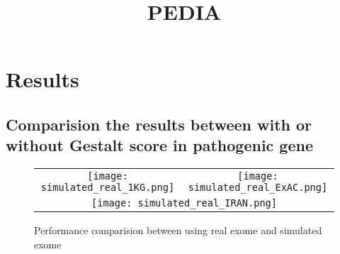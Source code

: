 \documentclass[12pt,cspaper]{paper}
\begin{document}
\title{PEDIA}

\maketitle

\begin{comment}
\section{Data preprocessing}
We have 348 cases in total. 329 of them are simulated, and 19 are real
cases. There are 9 cases are excluded in preprocessing, because we can
not find the pathogenic mutation gene in their gene list. The
details of cases which we excluded are listed in Table
\ref{table:problem_case}.

After preprocessing, we have 339 cases, and there are 66 cases without Gestalt score in the pathogenic
mutation gene. The detail of these cases are listed in Table
\ref{table:no_gestalt_sample}. Later, we will compare the results
between using 339 cases and 273 cases.



\end{comment}
\section{Results}
\subsection{Comparision the results between with or without Gestalt
score in pathogenic gene}
\begin{comment}
Table \ref{table:cv} and Table \ref{table:cv_g} show the result of
10-fold cross validation between using all cases and only using the
cases with gestalt score in pathogenic mutation gene.
In Table \ref{table:cv_sample_no_g}, it show the result of 66 cases
without gestalt score in pathogenic mutation gene.
The distribution of pedia score are shown on Table \ref{table:pedia_cv}
and Table \ref{table:pedia_cv_g}.
\end{comment}


\begin{figure}[ht]
  \begin{center}
    \graphicspath{{./}}
    \begin{tabular}{cc}
      \texttt{[image: simulated\_real\_1KG.png]}&
      \texttt{[image: simulated\_real\_ExAC.png]}\\
      \multicolumn{2}{c}{\texttt{[image: simulated\_real\_IRAN.png]}}\\
    \end{tabular}
  \caption{Performance comparision between using real exome and
  simulated exome}
  \end{center}
\end{figure}




\end{document}

